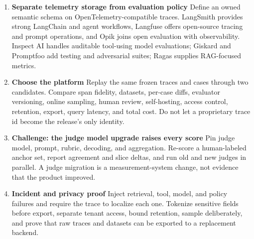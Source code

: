 \begin{enumerate}
\item \textbf{Separate telemetry storage from evaluation policy} Define an owned semantic schema on OpenTelemetry-compatible traces. LangSmith provides strong LangChain and agent workflows, Langfuse offers open-source tracing and prompt operations, and Opik joins open evaluation with observability. Inspect AI handles auditable tool-using model evaluations; Giskard and Promptfoo add testing and adversarial suites; Ragas supplies RAG-focused metrics.
\item \textbf{Choose the platform} Replay the same frozen traces and cases through two candidates. Compare span fidelity, datasets, per-case diffs, evaluator versioning, online sampling, human review, self-hosting, access control, retention, export, query latency, and total cost. Do not let a proprietary trace id become the release's only identity.
\item \textbf{Challenge: the judge model upgrade raises every score} Pin judge model, prompt, rubric, decoding, and aggregation. Re-score a human-labeled anchor set, report agreement and slice deltas, and run old and new judges in parallel. A judge migration is a measurement-system change, not evidence that the product improved.
\item \textbf{Incident and privacy proof} Inject retrieval, tool, model, and policy failures and require the trace to localize each one. Tokenize sensitive fields before export, separate tenant access, bound retention, sample deliberately, and prove that raw traces and datasets can be exported to a replacement backend.
\end{enumerate}

